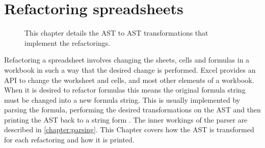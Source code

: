 \documentclass[12pt,a4paper,onecolumn,oneside,parskip]{memoir}
\newcommand{\todo}[1]{\textbf{TODO: #1}}
\begin{document}
%
%
%
%
%
%
%
%



\chapter{Refactoring spreadsheets}
\label{chapter:implementingrefactorings}

\noindent
\begin{figure}[h!]
\hspace*{0.003\textwidth}

\caption{This chapter details the AST to AST transformations that implement the refactorings.}
\end{figure}

Refactoring a spreadsheet involves changing the sheets, cells and formulas in a workbook in such a way that the desired change is performed.
Excel provides an API to change the worksheet and cells, and most other elements of a workbook.
When it is desired to refactor formulas this means the original formula string must be changed into a new formula string.
This is usually implemented by parsing the formula, performing the desired transformations on the AST and then printing the AST back to a string form \cite{fowler1999refactoring}.
The inner workings of the parser are described in \ref{chapter:parsing}.
This Chapter covers how the AST is transformed for each refactoring and how it is printed.
\end{document}
